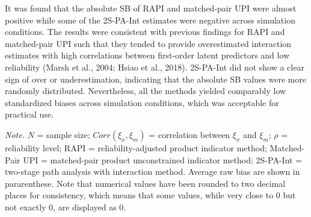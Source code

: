 \documentclass[
  man]{apa7}
\newenvironment{lltable}{\begin{landscape}\centering\begin{ThreePartTable}}{\end{ThreePartTable}\end{landscape}}
\begin{document}
It was found that the absolute SB of RAPI and matched-pair UPI were almost positive while some of the 2S-PA-Int estimates were negative across simulation conditions. The results were consistent with previous findings for RAPI and matched-pair UPI such that they tended to provide overestimated interaction estimates with high correlations between first-order latent predictors and low reliability (Marsh et al., 2004; Hsiao et al., 2018). 2S-PA-Int did not show a clear sign of over or underestimation, indicating that the absolute SB values were more randomly distributed. Nevertheless, all the methods yielded comparably low standardized biases across simulation conditions, which was acceptable for practical use.

\begin{lltable}

\begin{TableNotes}[para]
\normalsize{\textit{Note.} $\textit{N}$ = sample size; $Corr(\xi_{x}, \xi_{m})$ = correlation between $\xi_{x}$ and $\xi_{m}$; $\rho$ = reliability level; RAPI = reliability-adjusted product indicator method; Matched-Pair UPI = matched-pair product unconstrained indicator method; 2S-PA-Int = two-stage path analysis with interaction method. Average raw bias are shown in pararenthese. Note that numerical values have been rounded to two decimal places for consistency, which means that some values, while very close to 0 but not exactly 0, are displayed as 0.}
\end{TableNotes}

\small{

}
\end{lltable}
\end{document}
